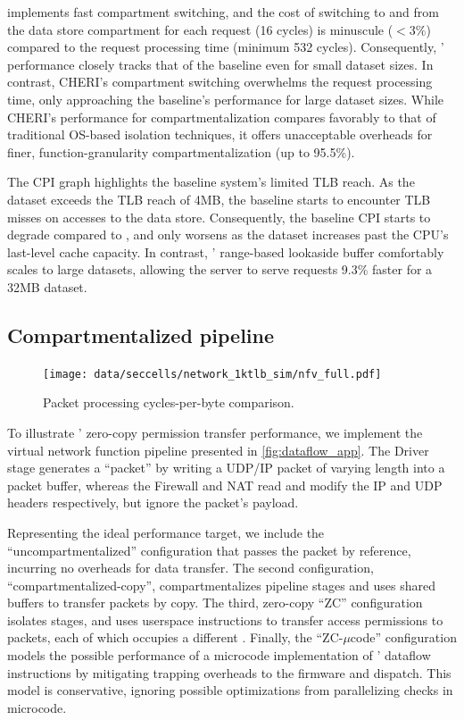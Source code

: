 \seccells implements fast compartment switching, and 
the cost of switching to and from the data store compartment
for each request (16 cycles) is minuscule ($< 3\%$) compared to the
request processing time (minimum 532 cycles).
Consequently, \seccells' performance closely tracks that of 
the baseline even for small dataset sizes.
In contrast, CHERI's compartment switching overwhelms the
request processing time, only approaching the baseline's
performance for large dataset sizes.
While CHERI's performance for compartmentalization compares
favorably to that of traditional OS-based isolation 
techniques, it offers unacceptable overheads for finer, 
function-granularity compartmentalization (up to 95.5\%).

The CPI graph highlights the baseline system's limited TLB 
reach.
As the dataset exceeds the TLB reach of 4MB, the baseline starts
to encounter TLB misses on accesses to the data store.
Consequently, the baseline CPI starts to degrade compared to
\seccells, and only worsens as the dataset increases past the
CPU's last-level cache capacity.
In contrast, \seccells' range-based lookaside buffer comfortably
scales to large datasets, allowing the  server to
serve requests 9.3\% faster for a 32MB dataset.
 
\subsection{Compartmentalized pipeline}

\begin{figure}
  \centering
  \texttt{[image: data/seccells/network\_1ktlb\_sim/nfv\_full.pdf]}
  \caption[\seccells performance comparison: Network function]
          {Packet processing cycles-per-byte comparison.}
  \label{fig:nfv_cpb}
\end{figure}

To illustrate \seccells' zero-copy permission transfer performance,
we implement the virtual network function pipeline presented in
\autoref{fig:dataflow_app}.
The Driver stage generates a ``packet'' by writing a UDP/IP packet
of varying length into a packet buffer, whereas 
the Firewall and NAT read and modify the IP and UDP headers
respectively, but ignore the packet's payload.

Representing the ideal performance target,  we include the
``uncompartmentalized'' configuration that passes the packet by 
reference, incurring no overheads for data transfer.
The second configuration, ``compartmentalized-copy'', 
compartmentalizes pipeline stages and uses shared buffers to transfer
packets by copy.
The third, zero-copy ``\seccells ZC''  configuration isolates
stages, and uses userspace instructions to transfer 
access permissions to packets, each of which occupies a
different \cell{}.
Finally, the ``\seccells ZC-$\mu$code'' configuration models the 
possible performance of a microcode implementation of \seccells' 
dataflow instructions by mitigating trapping overheads
to the firmware and dispatch.
This model is conservative, ignoring possible optimizations from
parallelizing checks in microcode.

